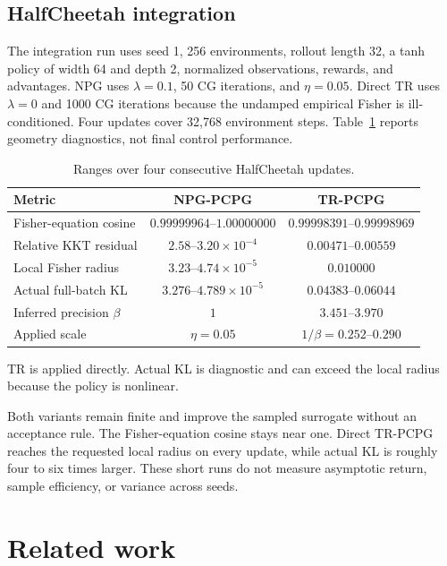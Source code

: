 \documentclass{article}
\begin{document}
\subsection{HalfCheetah integration}
The integration run uses seed 1, 256 environments, rollout length 32, a tanh policy of width 64 and depth 2, normalized observations, rewards, and advantages. NPG uses $\lambda=0.1$, 50 CG iterations, and $\eta=0.05$. Direct TR uses $\lambda=0$ and 1000 CG iterations because the undamped empirical Fisher is ill-conditioned. Four updates cover 32,768 environment steps. Table~\ref{tab:mujoco} reports geometry diagnostics, not final control performance.

\begin{table}[h]
\caption{Ranges over four consecutive HalfCheetah updates.}
\label{tab:mujoco}
\centering
\small
\begin{tabular}{lcc}
\toprule
Metric & NPG-PCPG & TR-PCPG \\
\midrule
Fisher-equation cosine & $0.99999964$--$1.00000000$ & $0.99998391$--$0.99998969$ \\
Relative KKT residual & $2.58$--$3.20\times10^{-4}$ & $0.00471$--$0.00559$ \\
Local Fisher radius & $3.23$--$4.74\times10^{-5}$ & $0.010000$ \\
Actual full-batch KL & $3.276$--$4.789\times10^{-5}$ & $0.04383$--$0.06044$ \\
Inferred precision $\beta$ & $1$ & $3.451$--$3.970$ \\
Applied scale & $\eta=0.05$ & $1/\beta=0.252$--$0.290$ \\
\bottomrule
\end{tabular}
\vspace{2pt}
\begin{minipage}{0.98\linewidth}\footnotesize
TR is applied directly. Actual KL is diagnostic and can exceed the local radius because the policy is nonlinear.
\end{minipage}
\end{table}

Both variants remain finite and improve the sampled surrogate without an acceptance rule. The Fisher-equation cosine stays near one. Direct TR-PCPG reaches the requested local radius on every update, while actual KL is roughly four to six times larger. These short runs do not measure asymptotic return, sample efficiency, or variance across seeds.

\section{Related work}
\end{document}
